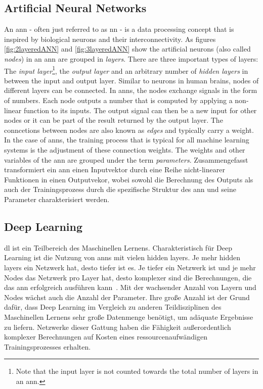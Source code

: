 \documentclass[
			   fontsize=11pt,
               paper=a4,
               bibliography=totoc,
               idxtotoc,
               headsepline,
               footsepline,
               footinclude=false,
               BCOR=12mm,
               DIV=13,
               openany,   %
               ]
               {scrbook}
\begin{document}
\subsection{Artificial Neural Networks}

An \gls{ann} - often just referred to as \gls{nn} - is a data processing concept that is inspired by biological neurons and their interconnectivity. As figures \ref{fig:2layeredANN} and \ref{fig:3layeredANN} show the artificial neurons (also called \textit{nodes}) in an \gls{ann} are grouped in \textit{layers}. There are three important types of layers: The \textit{input layer}\footnote{Note that the input layer is not counted towards the total number of layers in an \gls{ann}.}, the \textit{output layer} and an arbitrary number of \textit{hidden layers} in between the input and output layer. Similar to neurons in human brains, nodes of different layers can be connected. In \glspl{ann}, the nodes exchange signals in the form of numbers. Each node outputs a number that is computed by applying a non-linear function to its inputs. The output signal can then be a new input for other nodes or it can be part of the result returned by the output layer. The conncetions between nodes are also known as \textit{edges} and typically carry a weight. In the case of \glspl{ann}, the training process that is typical for all machine learning systems is the adjustment of these connection weights. The weights and other variables of the \gls{ann} are grouped under the term \textit{parameters}. Zusammengefasst transformiert ein \gls{ann} einen Inputvektor durch eine Reihe nicht-linearer Funktionen in einen Outputvekor, wobei sowohl die Berechnung des Outputs als auch der Trainingsprozess durch die spezifische Struktur des \gls{ann} und seine Parameter charakterisiert werden.


\subsection{Deep Learning}

\Gls{dl} ist ein Teilbereich des Maschinellen Lernens. Charakteristisch für Deep Learning ist die Nutzung von \glspl{ann} mit vielen hidden layers. Je mehr hidden layers ein Netzwerk hat, desto tiefer ist es. Je tiefer ein Netzwerk ist und je mehr Nodes das Netzwerk pro Layer hat, desto komplexer sind die Berechnungen, die das \gls{ann} erfolgreich ausführen kann~\cite{dlBookGoodf}. Mit der wachsender Anzahl von Layern und Nodes wächst auch die Anzahl der Parameter. Ihre große Anzahl ist der Grund dafür, dass Deep Learning im Vergleich zu anderen Teildisziplinen des Maschinellen Lernens sehr große Datenmenge benötigt, um adäquate Ergebnisse zu liefern. Netzwerke dieser Gattung haben die Fähigkeit außerordentlich komplexer Berechnungen auf Kosten eines ressourcenaufwändigen Trainingsprozesses erhalten.
\end{document}
